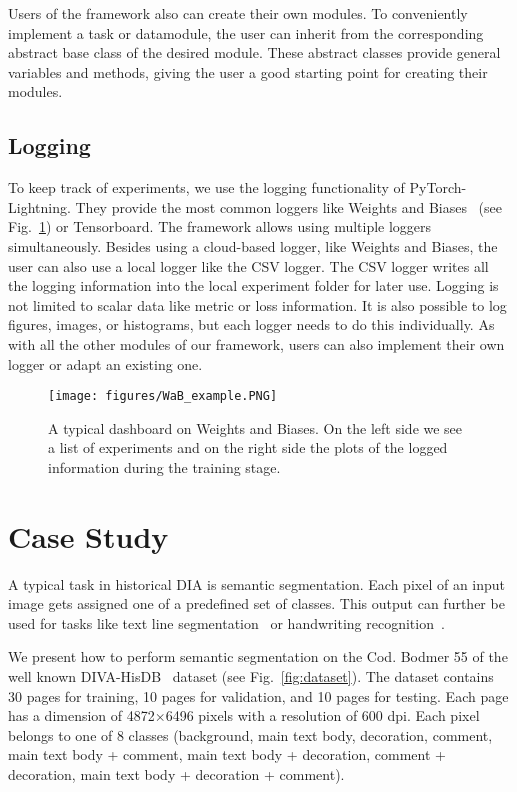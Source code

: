 \documentclass[runningheads]{llncs}
\begin{document}
Users of the framework also can create their own modules.
To conveniently implement a task or datamodule, the user can inherit from the corresponding abstract base class of the desired module.
These abstract classes provide general variables and methods, giving the user a good starting point for creating their modules.



\subsection{Logging}\label{subsec:features_logging}
To keep track of experiments, we use the logging functionality of PyTorch-Lightning.
They provide the most common loggers like Weights and Biases~\cite{biewaldExperimentTrackingWeights2020} (see Fig.~\ref{fig:wandb_example}) or Tensorboard.
The framework allows using multiple loggers simultaneously.
Besides using a cloud-based logger, like Weights and Biases, the user can also use a local logger like the CSV logger.
The CSV logger writes all the logging information into the local experiment folder for later use.
Logging is not limited to scalar data like metric or loss information. 
It is also possible to log figures, images, or histograms, but each logger needs to do this individually.
As with all the other modules of our framework, users can also implement their own logger or adapt an existing one.


\begin{figure}[ht]
    \centering
    \texttt{[image: figures/WaB\_example.PNG]}
    \caption{A typical dashboard on Weights and Biases. On the left side we see a list of experiments and on the right side the plots of the logged information during the training stage.}
    \label{fig:wandb_example}
\end{figure}


 
\newpage
\section{Case Study}
A typical task in historical \acf{DIA} is semantic segmentation.
Each pixel of an input image gets assigned one of a predefined set of classes.
This output can further be used for tasks like text line segmentation~\cite{albertiLabelingCuttingGrouping2019} or handwriting recognition~\cite{joHandwrittenTextSegmentation2019}.

We present how to perform semantic segmentation on the Cod. Bodmer 55 of the well known DIVA-HisDB~\cite{simistiraDIVAHisDBPreciselyAnnotated2016} dataset (see Fig.~\ref{fig:dataset}). 
The dataset contains 30 pages for training, 10 pages for validation, and 10 pages for testing. Each page has a dimension of 4872$\times$6496 pixels with a resolution of 600 dpi.
Each pixel belongs to one of 8 classes (background, main text body, decoration, comment, main text body + comment, main text body + decoration, comment + decoration,  main text body + decoration + comment).
\end{document}
